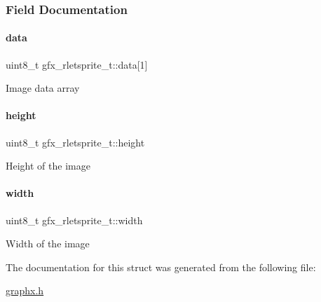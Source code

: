 \subsubsection{Field Documentation}
\mbox{\label{structgfx__rletsprite__t_a66f60be1317945414d120b0690332f2a}} 
\paragraph{\texorpdfstring{data}{data}}
{\footnotesize\ttfamily uint8\+\_\+t gfx\+\_\+rletsprite\+\_\+t\+::data\mbox{[}1\mbox{]}}

Image data array \mbox{\label{structgfx__rletsprite__t_a08e8d294d6fe298330f0e5fde0ed817d}} 
\paragraph{\texorpdfstring{height}{height}}
{\footnotesize\ttfamily uint8\+\_\+t gfx\+\_\+rletsprite\+\_\+t\+::height}

Height of the image \mbox{\label{structgfx__rletsprite__t_a8b200b1870ef60d5a682d0a8bab71bd0}} 
\paragraph{\texorpdfstring{width}{width}}
{\footnotesize\ttfamily uint8\+\_\+t gfx\+\_\+rletsprite\+\_\+t\+::width}

Width of the image 

The documentation for this struct was generated from the following file\+:\begin{DoxyCompactItemize}
\item 
\hyperlink{graphx_8h}{graphx.\+h}\end{DoxyCompactItemize}
